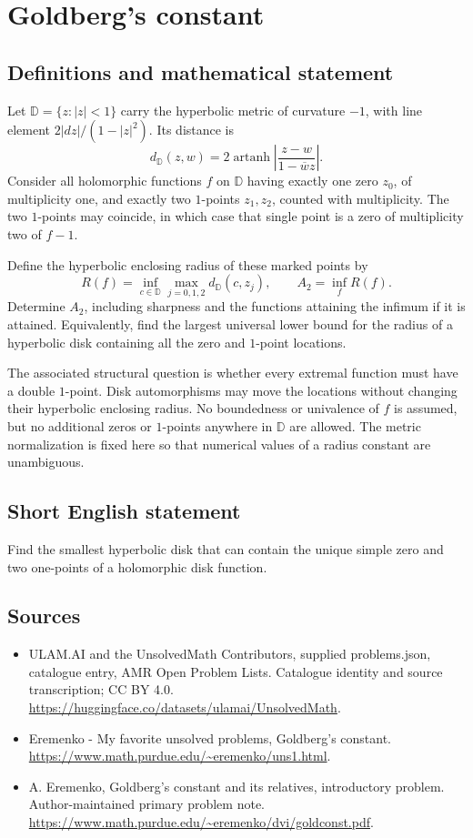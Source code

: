 \documentclass[11pt,a4paper]{article}
\begin{document}
\section*{Goldberg's constant}\label{statement}

\subsection{Definitions and mathematical statement}
Let $\mathbb D=\{z:|z|<1\}$ carry the hyperbolic metric
of curvature $-1$, with line element
$2|dz|/(1-|z|^2)$. Its distance is
\[
 d_{\mathbb D}(z,w)=2\operatorname{artanh}
                 \left|\frac{z-w}{1-\overline w z}\right|.
\]
Consider all holomorphic functions $f$ on $\mathbb D$
having exactly one zero $z_0$, of multiplicity one, and
exactly two $1$-points $z_1,z_2$, counted with multiplicity.
The two $1$-points may coincide, in which case that
single point is a zero of multiplicity two of $f-1$.

Define the hyperbolic enclosing radius of these marked
points by
\[
 R(f)=\inf_{c\in\mathbb D}
            \max_{j=0,1,2}d_{\mathbb D}(c,z_j),
 \qquad A_2=\inf_f R(f).
\]
Determine $A_2$, including sharpness and the functions
attaining the infimum if it is attained. Equivalently,
find the largest universal lower bound for the radius
of a hyperbolic disk containing all the zero and
$1$-point locations.

The associated structural question is whether every
extremal function must have a double $1$-point.
Disk automorphisms may move the locations without changing
their hyperbolic enclosing radius. No boundedness or
univalence of $f$ is assumed, but no additional zeros
or $1$-points anywhere in $\mathbb D$ are allowed.
The metric normalization is fixed here so that numerical
values of a radius constant are unambiguous.
\subsection{Short English statement}
Find the smallest hyperbolic disk that can contain the unique simple zero and two one-points of a holomorphic disk function.
\subsection{Sources}
\begin{itemize}
\item[S1] ULAM.AI and the UnsolvedMath Contributors, supplied problems.json, catalogue entry, AMR Open Problem Lists. Catalogue identity and source transcription; CC BY 4.0.
\url{https://huggingface.co/datasets/ulamai/UnsolvedMath}.
\item[S2] Eremenko - My favorite unsolved problems, Goldberg's constant. 
\url{https://www.math.purdue.edu/~eremenko/uns1.html}.
\item[S3] A. Eremenko, Goldberg's constant and its relatives, introductory problem. Author-maintained primary problem note.
\url{https://www.math.purdue.edu/~eremenko/dvi/goldconst.pdf}.
\end{itemize}
\end{document}

